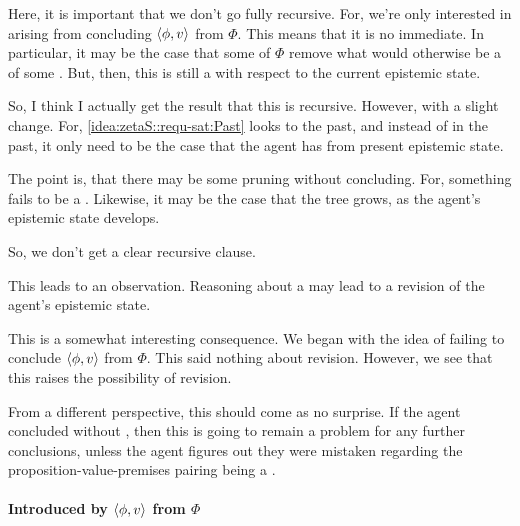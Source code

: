 \begin{note}[Recursion]
   {
    \color{red}
    Here, it is important that we don't go fully recursive.
    For, we're only interested in  arising from concluding \(\langle \phi, v \rangle\) from \(\Phi\).
    This means that it is no immediate.
    In particular, it may be the case that some of \(\Phi\) remove what would otherwise be a \requ{} of some \requ{}.
    But, then, this is still a \requ{} with respect to the current epistemic state.

    So, I think I actually get the result that this is recursive.
    However, with a slight change.
    For, \ref{idea:zetaS::requ-sat:Past} looks to the past, and instead of \csVImp{} in the past, it only need to be the case that the agent has \csVed{} from present epistemic state.

    The point is, that there may be some pruning without concluding.
    For, something fails to be a \requ{}.
    Likewise, it may be the case that the tree grows, as the agent's epistemic state develops.

    So, we don't get a clear recursive clause.

    This leads to an observation.
    Reasoning about a \requ{} may lead to a revision of the agent's epistemic state.

    This is a somewhat interesting consequence.
    We began with the idea of failing to conclude \(\langle \phi, v \rangle\) from \(\Phi\).
    This said nothing about revision.
    However, we see that this raises the possibility of revision.

    From a different perspective, this should come as no surprise.
    If the agent concluded without \csN{}, then this is going to remain a problem for any further conclusions, unless the agent figures out they were mistaken regarding the proposition-value-premises pairing being a \requ{}.
  }
\end{note}

\paragraph*{Introduced by \(\langle \phi, v \rangle\) from \(\Phi\)}

